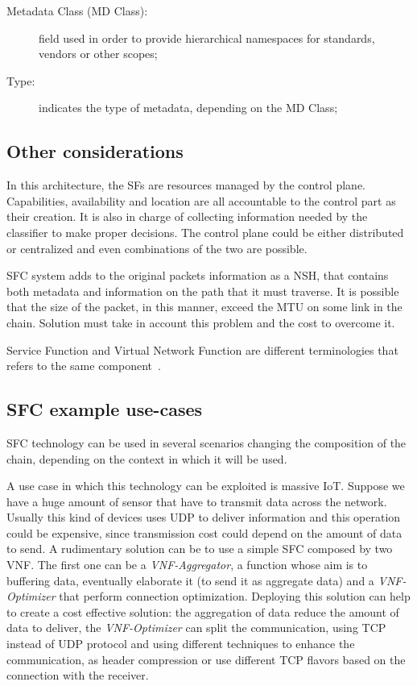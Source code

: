 \begin{description}
  \item[Metadata Class (MD Class):] field used in order to provide hierarchical
  namespaces for standards, vendors or other scopes;
  \item[Type:] indicates the type of metadata, depending on the MD Class;
\end{description}

\subsection{Other considerations}
In this architecture, the SFs are resources managed by the control
plane. Capabilities, availability and location are all accountable to the
control part as their creation. It is also in charge of collecting information
needed by the classifier to make proper decisions. The control plane could be
either distributed or centralized and even combinations of the two are
possible.

SFC system adds to the original packets information as a NSH, that contains both
metadata and information on the path that it must traverse. It is possible that
the size of the packet, in this manner, exceed the MTU on some link in the
chain. Solution must take in account this problem and the cost to overcome it.

Service Function and Virtual Network Function are different terminologies that
refers to the same component~\cite{medhat2017service}.

\subsection{SFC example use-cases}
SFC technology can be used in several scenarios changing the composition of the
chain, depending on the context in which it will be used.

A use case in which this technology can be exploited is massive IoT. Suppose we
have a huge amount of sensor that have to transmit data across the network.
Usually this kind of devices uses UDP to deliver information and this
operation could be expensive, since transmission cost could depend on the amount
of data to send. A rudimentary solution can be to use a simple SFC composed by
two VNF. The first one can be a \emph{VNF-Aggregator}, a function whose aim is
to buffering data, eventually elaborate it (to send it as aggregate data) and a
\emph{VNF-Optimizer} that perform connection optimization. Deploying this
solution can help to create a cost effective solution: the aggregation of data
reduce the amount of data to deliver, the \emph{VNF-Optimizer} can split the
communication, using TCP instead of UDP protocol and using different techniques
to enhance the communication, as header compression or use different TCP
flavors based on the connection with the receiver.

